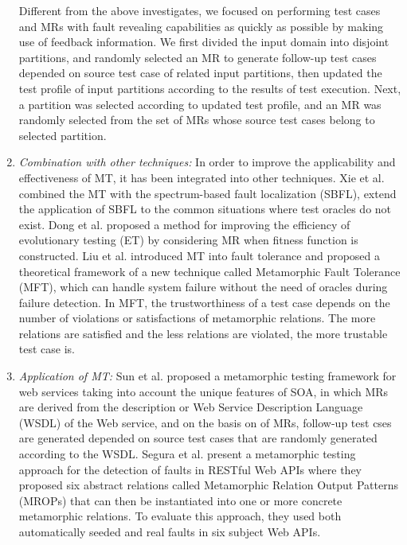 \documentclass[conference]{IEEEtran}
\begin{document}
\begin{enumerate}[1]
  Different from the above investigates, we focused on performing test cases and MRs with fault revealing capabilities as quickly as possible by making use of feedback information. We first divided the input domain into disjoint partitions, and randomly selected an MR to generate follow-up test cases depended on source test case of related input partitions, then updated the test profile of input partitions according to the results of test execution. Next, a partition was selected according to updated test profile, and an MR was randomly selected from the set of MRs whose source test cases belong to selected partition.
  \item
  \emph{Combination with other techniques:} In order to improve the applicability and effectiveness of MT, it has been integrated into other techniques.
  Xie et al. \cite{xie2013metamorphic} combined the MT with the spectrum-based fault localization (SBFL), extend the application of SBFL to the common situations where test oracles do not exist.
  Dong et al. \cite{dong2010security} proposed a method for improving the efficiency of evolutionary testing (ET) by considering MR when fitness function is constructed.
  Liu et al. \cite{liu2014metamorphic} introduced MT into fault tolerance and proposed a theoretical framework of a new technique called Metamorphic Fault Tolerance (MFT), which can
  handle system failure without the need of oracles during failure detection. In MFT, the trustworthiness of a test case depends on the number of violations or satisfactions of metamorphic relations. The more relations are satisfied and the less relations are violated, the more trustable test case is.
  \item
  \emph{Application of MT:}
  Sun et al. \cite{sun2011metamorphic, sun2012metamorphic} proposed a metamorphic testing framework for web services taking into account the unique features of SOA, in which MRs are derived from the description or Web Service Description Language (WSDL) \cite{sun2011metamorphic} of the Web service, and on the basis on of MRs, follow-up test cses are generated depended on source test cases that are randomly generated according to the WSDL.
  Segura et al. \cite{segura2018metamorphic} present a metamorphic testing approach for the detection of faults in RESTful Web APIs where they proposed six abstract relations called Metamorphic Relation Output Patterns (MROPs) that can then be instantiated into one or more concrete metamorphic relations. To evaluate this approach, they used both automatically seeded and real faults in six subject Web APIs.

\end{enumerate}
\end{document}

